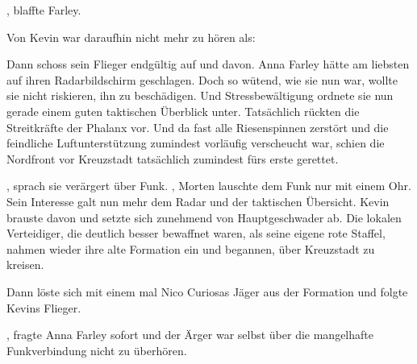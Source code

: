 \par

, blaffte Farley. 

\par

Von Kevin war daraufhin nicht mehr zu hören als: 

\par

Dann schoss sein Flieger endgültig auf und davon. Anna Farley hätte am liebsten auf ihren Radarbildschirm geschlagen. Doch so wütend, wie sie nun war, wollte sie nicht riskieren, ihn zu beschädigen. Und Stressbewältigung ordnete sie nun gerade einem guten taktischen Überblick unter. Tatsächlich rückten die Streitkräfte der Phalanx vor. Und da fast alle Riesenspinnen zerstört und die feindliche Luftunterstützung zumindest vorläufig verscheucht war, schien die Nordfront vor Kreuzstadt tatsächlich zumindest fürs erste gerettet.

\par

, sprach sie verärgert über Funk. 
\ortswechsel
{}, Morten lauschte dem Funk nur mit einem Ohr. Sein Interesse galt nun mehr dem Radar und der taktischen Übersicht. Kevin brauste davon und setzte sich zunehmend von Hauptgeschwader ab. Die lokalen Verteidiger, die deutlich besser bewaffnet waren, als seine eigene rote Staffel, nahmen wieder ihre alte Formation ein und begannen, über Kreuzstadt zu kreisen.

\par

Dann löste sich mit einem mal Nico Curiosas Jäger aus der Formation und folgte Kevins Flieger.

\par

, fragte Anna Farley sofort und der Ärger war selbst über die mangelhafte Funkverbindung nicht zu überhören.

\par

